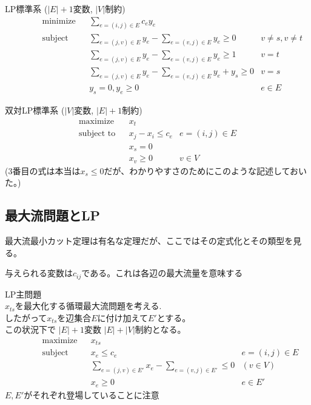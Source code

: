 \documentclass[13pt, a4paper, landscape]{jarticle}
\theoremstyle{nonitalic} %
\begin{document}
LP標準系
($|E|+1$変数, $|V|$制約)
\begin{align}
 &&&&&\textrm{minimize}   && \sum_{e=(i,j) \in E} c_e y_e \\
 &&&&&\textrm{subject to} && \sum_{e=(j,v) \in E} y_e - \sum_{e=(v,j) \in E} y_e \geq 0 & v\neq s, v\neq t  &&&&&\\
 &&&&&                    && \sum_{e=(j,v) \in E} y_e - \sum_{e=(v,j) \in E} y_e \geq 1 & v = t  &&&&&\\
 &&&&&                    && \sum_{e=(j,v) \in E} y_e - \sum_{e=(v,j) \in E} y_e  + y_s \geq 0 & v=s &&&&&\\
 &&&&&                    && y_s=0, y_e \geq 0 & e \in E&&&&&
\end{align}

双対LP標準系
($|V|$変数, $|E|+1$制約)
\begin{align}
 &&&&&\textrm{maximize}   && x_t  \\
 &&&&&\textrm{subject to} && x_j - x_i\leq c_e & e = (i,j) \in E  &&&&&\\
 &&&&&                    && x_s = 0 &&&&&& \\
 &&&&&                    && x_v \geq 0 & v \in V &&&&&
\end{align}
(3番目の式は本当は$x_s \leq 0$だが、わかりやすさのためにこのような記述しておいた。) \\


\subsection{最大流問題とLP}
最大流最小カット定理は有名な定理だが、ここではその定式化とその類型を見る。

与えられる変数は$c_{ij}$である。これは各辺の最大流量を意味する

LP主問題 \\
$x_{ts}$を最大化する循環最大流問題を考える. \\
したがって$x_{ts}$を辺集合$E$に付け加えて$E'$とする。\\
この状況下で $|E|+1$変数 $|E|+|V|$制約となる。
\begin{align}
 &&&&&\textrm{maximize}   && x_{ts}  \\
 &&&&&\textrm{subject to} && x_e\leq c_e & e = (i,j) \in E  &&&&&\\
 &&&&&                    && \sum_{e = (j,v) \in E'} x_e - \sum_{e=(v,j) \in E'} \leq 0 & (v \in V) &&&&& \\
 &&&&&                    && x_e \geq 0 & e \in E' &&&&&
\end{align}
$E, E'$がそれぞれ登場していることに注意
\end{document}
